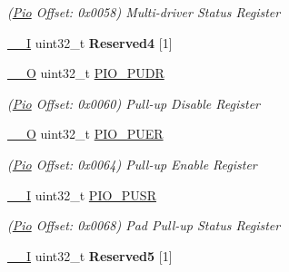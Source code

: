 \begin{DoxyCompactItemize}
\begin{DoxyCompactList}\small\item\em (\mbox{\hyperlink{structPio}{Pio}} Offset\+: 0x0058) Multi-\/driver Status Register \end{DoxyCompactList}\item 
\mbox{\label{structPio_a6057c301b0f7312cac6dce0fbb6c416d}} 
\mbox{\hyperlink{core__cm7_8h_af63697ed9952cc71e1225efe205f6cd3}{\+\_\+\+\_\+I}} uint32\+\_\+t {\bfseries Reserved4} \mbox{[}1\mbox{]}
\item 
\mbox{\label{structPio_a4410ebdd04205168f4c15c40c8d0bb68}} 
\mbox{\hyperlink{core__cm7_8h_a7e25d9380f9ef903923964322e71f2f6}{\+\_\+\+\_\+O}} uint32\+\_\+t \mbox{\hyperlink{structPio_a4410ebdd04205168f4c15c40c8d0bb68}{P\+I\+O\+\_\+\+P\+U\+DR}}
\begin{DoxyCompactList}\small\item\em (\mbox{\hyperlink{structPio}{Pio}} Offset\+: 0x0060) Pull-\/up Disable Register \end{DoxyCompactList}\item 
\mbox{\label{structPio_ac0fedbb32919ba433a9a7a25f889661a}} 
\mbox{\hyperlink{core__cm7_8h_a7e25d9380f9ef903923964322e71f2f6}{\+\_\+\+\_\+O}} uint32\+\_\+t \mbox{\hyperlink{structPio_ac0fedbb32919ba433a9a7a25f889661a}{P\+I\+O\+\_\+\+P\+U\+ER}}
\begin{DoxyCompactList}\small\item\em (\mbox{\hyperlink{structPio}{Pio}} Offset\+: 0x0064) Pull-\/up Enable Register \end{DoxyCompactList}\item 
\mbox{\label{structPio_af4f5554625c118259ca076b0bf3dc0c4}} 
\mbox{\hyperlink{core__cm7_8h_af63697ed9952cc71e1225efe205f6cd3}{\+\_\+\+\_\+I}} uint32\+\_\+t \mbox{\hyperlink{structPio_af4f5554625c118259ca076b0bf3dc0c4}{P\+I\+O\+\_\+\+P\+U\+SR}}
\begin{DoxyCompactList}\small\item\em (\mbox{\hyperlink{structPio}{Pio}} Offset\+: 0x0068) Pad Pull-\/up Status Register \end{DoxyCompactList}\item 
\mbox{\label{structPio_afec508ba4b395fbdb488b5942470cb68}} 
\mbox{\hyperlink{core__cm7_8h_af63697ed9952cc71e1225efe205f6cd3}{\+\_\+\+\_\+I}} uint32\+\_\+t {\bfseries Reserved5} \mbox{[}1\mbox{]}

\end{DoxyCompactItemize}
